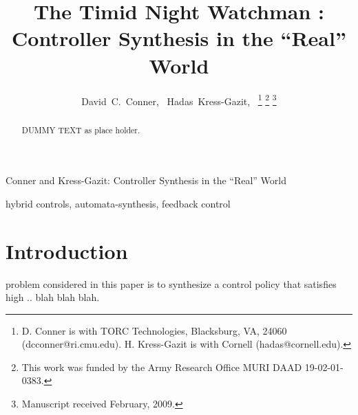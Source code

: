 \documentclass[journal,twoside]{IEEEtran}
\def \TROTITLE {{ The Timid Night Watchman :\\ Controller Synthesis in the ``Real'' World}}
\def \SHORTTROTITLE {{ Controller Synthesis in the ``Real'' World }}
\begin{document}
%

\title{\TROTITLE}

\author{David~C.~Conner,~
  Hadas~Kress-Gazit,~%
  \thanks{D. Conner is with TORC Technologies, Blacksburg, VA, 24060
    (dcconner@ri.cmu.edu).  H. Kress-Gazit is with Cornell
    (hadas@cornell.edu).}%
  \thanks{This work was funded by the Army Research Office MURI DAAD
    19-02-01-0383.}%
  \thanks{Manuscript received February, 2009.}
 }

{Conner and Kress-Gazit: \SHORTTROTITLE }


\maketitle


\begin{abstract}

  DUMMY TEXT as place holder.  

\end{abstract}

\begin{IEEEkeywords}
  hybrid controls, automata-synthesis, feedback control
\end{IEEEkeywords}

%
\IEEEpeerreviewmaketitle



\section{Introduction}
 problem considered in this paper is to synthesize
a control policy that satisfies high .. blah blah blah.
\end{document}
